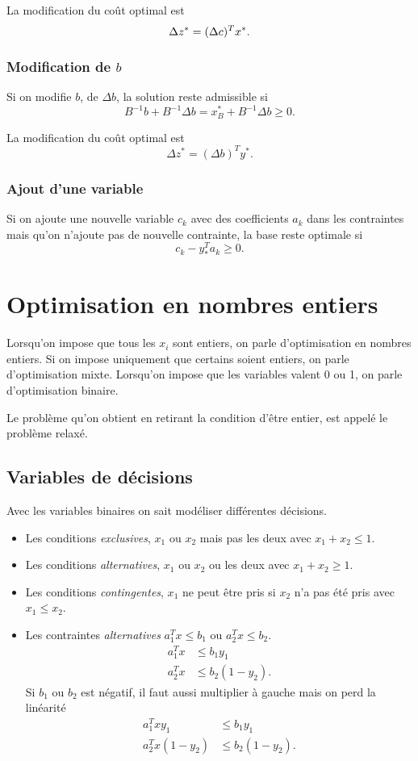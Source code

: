 La modification du coût optimal est
\[ \Delta z^* = (\Delta c)^T x^*. \]

\subsubsection{Modification de $b$}
Si on modifie $b$, de $\Delta b$, la solution reste admissible si
\[ B^{-1}b + B^{-1}\Delta b = x_B^* + B^{-1} \Delta b \geq 0. \]

La modification du coût optimal est
\[ \Delta z^* = (\Delta b)^T y^*. \]

\subsubsection{Ajout d'une variable}
Si on ajoute une nouvelle variable $c_k$ avec des coefficients $a_k$ dans
les contraintes mais qu'on n'ajoute pas de nouvelle contrainte,
la base reste optimale si
\[ c_k-y_*^Ta_k \geq 0. \]

\section{Optimisation en nombres entiers}
Lorsqu'on impose que tous les $x_i$ sont entiers, on parle d'optimisation
en nombres entiers.
Si on impose uniquement que certains soient entiers, on parle d'optimisation
mixte.
Lorsqu'on impose que les variables valent 0 ou 1,
on parle d'optimisation binaire.

Le problème qu'on obtient en retirant la condition d'être entier,
est appelé le problème relaxé.

\subsection{Variables de décisions}
Avec les variables binaires on sait modéliser
différentes décisions.
\begin{itemize}
  \item Les conditions \emph{exclusives}, $x_1$ ou $x_2$ mais pas les deux
    avec $x_1 + x_2 \leq 1$.
  \item Les conditions \emph{alternatives}, $x_1$ ou $x_2$ ou les deux
    avec $x_1 + x_2 \geq 1$.
  \item Les conditions \emph{contingentes}, $x_1$ ne peut être pris si
    $x_2$ n'a pas été pris avec $x_1 \leq x_2$.
  \item Les contraintes \emph{alternatives} $a_1^Tx \leq b_1$ ou
    $a_2^Tx \leq b_2$.
    \begin{align*}
      a_1^Tx & \leq b_1y_1\\
      a_2^Tx & \leq b_2(1-y_2).
    \end{align*}
    Si $b_1$ ou $b_2$ est négatif, il faut aussi multiplier à gauche mais
    on perd la linéarité
    \begin{align*}
      a_1^Txy_1 & \leq b_1y_1\\
      a_2^Tx(1-y_2) & \leq b_2(1-y_2).
    \end{align*}
\end{itemize}

